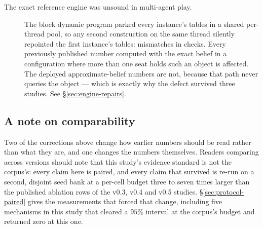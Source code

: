 \begin{description}
\item[The exact reference engine was unsound in multi-agent play.] The block dynamic program parked
  every instance's tables in a shared per-thread pool, so any second construction on the same thread
  silently repointed the first instance's tables: \numAliasMismatch{} mismatches in
  \numAliasChecks{} checks. Every previously published number computed with the exact belief in a
  configuration where more than one seat holds such an object is affected. The deployed
  approximate-belief numbers are not, because that path never queries the object --- which is
  exactly why the defect survived three studies. See \S\ref{sec:engine-repairs}.

\end{description}

\subsection{A note on comparability}
\label{sec:corr-comparability}

Two of the corrections above change how earlier numbers should be read rather than what they are,
and one changes the numbers themselves. Readers comparing across versions should note that this
study's evidence standard is not the corpus's: every claim here is paired, and every claim that
survived is re-run on a second, disjoint seed bank at a per-cell budget three to seven times larger
than the published ablation rows of the v0.3, v0.4 and v0.5 studies. \S\ref{sec:protocol-paired}
gives the measurements that forced that change, including five mechanisms in this study that cleared
a $95\%$ interval at the corpus's budget and returned zero at this one.

